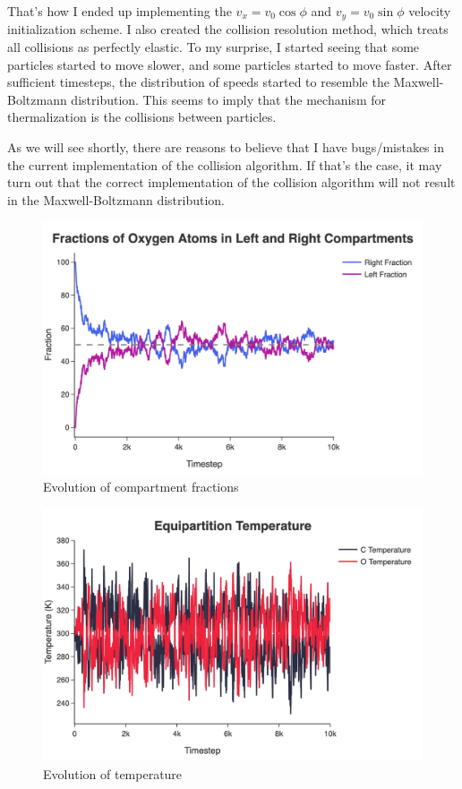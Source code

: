 \documentclass[10pt]{article}
\begin{document}
That's how I ended up implementing the $v_x=v_0 \cos\phi$ and $v_y=v_0 \sin \phi$ velocity initialization scheme. I also created the collision resolution method, which treats all collisions as perfectly elastic. To my surprise, I started seeing that some particles started to move slower, and some particles started to move faster. After sufficient timesteps, the distribution of speeds started to resemble the Maxwell-Boltzmann distribution. This seems to imply that the mechanism for thermalization is the collisions between particles.

\begin{warningbox}
    As we will see shortly, there are reasons to believe that I have bugs/mistakes in the current implementation of the collision algorithm. If that's the case, it may turn out that the correct implementation of the collision algorithm will not result in the Maxwell-Boltzmann distribution.
\end{warningbox}
\begin{figure}[ht]
    \centering
    \includegraphics[width=0.8\linewidth]{../figures/jpg/n200_m1_10k/compartment_fractions.jpg}
    \caption{Evolution of compartment fractions}
    \label{fig:compartment_fractions}
\end{figure}

\begin{figure}[h]
    \centering
    \includegraphics[width=0.8\linewidth]{../figures/jpg/n200_m1_10k/equipartition_temperature.jpg}
    \caption{Evolution of temperature}
    \label{fig:temperature}
\end{figure}
\end{document}
